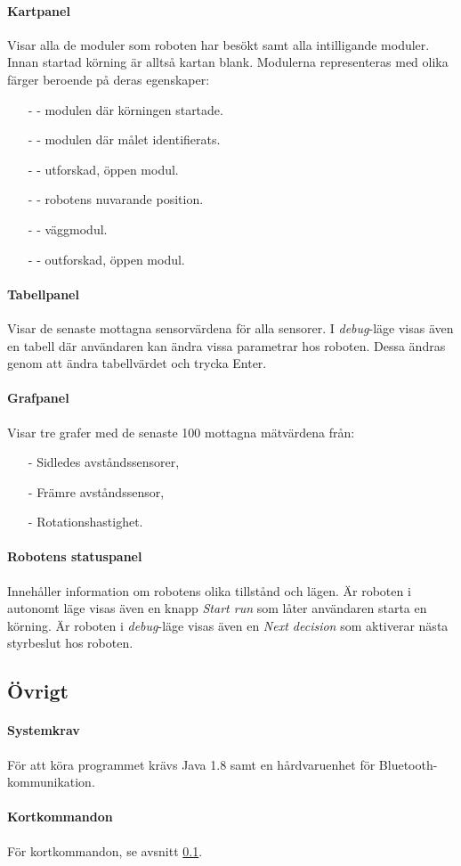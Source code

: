 \documentclass[11pt]{article}
\begin{document}
\paragraph{Kartpanel} Visar alla de moduler som roboten har besökt samt alla intilligande moduler. Innan startad körning är alltså kartan blank. Modulerna representeras med olika färger beroende på deras egenskaper:
\begin{itemize}
  \item[-]  - modulen där körningen startade.
  \item[-]  - modulen där målet identifierats.
  \item[-]  - utforskad, öppen modul.
  \item[-]  - robotens nuvarande position.
  \item[-]  - väggmodul.
  \item[-]  - outforskad, öppen modul.
\end{itemize}

\paragraph{Tabellpanel} Visar de senaste mottagna sensorvärdena för alla sensorer. I \textit{debug}-läge visas även en tabell där användaren kan ändra vissa parametrar hos roboten. Dessa ändras genom att ändra tabellvärdet och trycka Enter.

\paragraph{Grafpanel}
Visar tre grafer med  de senaste 100 mottagna mätvärdena från:
\begin{itemize}
  \item[-] Sidledes avståndssensorer,
  \item[-] Främre avståndssensor,
  \item[-] Rotationshastighet.
\end{itemize}

\paragraph{Robotens statuspanel}
Innehåller information om robotens olika tillstånd och lägen. Är roboten i autonomt läge visas även en knapp \emph{Start run} som låter användaren starta en körning. Är roboten i \textit{debug}-läge visas även en \emph{Next decision} som aktiverar nästa styrbeslut hos roboten. 

\subsection{Övrigt}
\label{shortcuts}
\paragraph{Systemkrav} För att köra programmet krävs Java 1.8 samt en hårdvaruenhet för Bluetooth\textsuperscript{\circledR}-kommunikation.
\paragraph{Kortkommandon}\label{kortkommandon}
För kortkommandon, se avsnitt \ref{shortcuts}.
\end{document}
